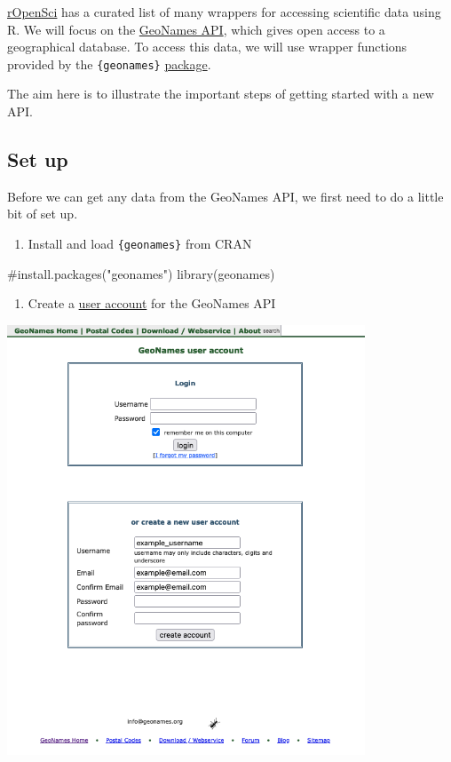\documentclass[
  letterpaper,
  DIV=11,
  numbers=noendperiod]{scrreprt}
\newenvironment{Shaded}{\begin{snugshade}}{\end{snugshade}}
\newcommand{\CommentTok}[1]{\textcolor[rgb]{0.37,0.37,0.37}{#1}}
\newcommand{\FunctionTok}[1]{\textcolor[rgb]{0.28,0.35,0.67}{#1}}
\newcommand{\NormalTok}[1]{\textcolor[rgb]{0.00,0.23,0.31}{#1}}
\providecommand{\tightlist}{%
  \setlength{\itemsep}{0pt}\setlength{\parskip}{0pt}}\usepackage{longtable,booktabs,array}
\begin{document}
\href{https://ropensci.org/}{rOpenSci} has a curated list of many
wrappers for accessing scientific data using R. We will focus on the
\href{https://www.geonames.org/}{GeoNames API}, which gives open access
to a geographical database. To access this data, we will use wrapper
functions provided by the \texttt{\{geonames\}}
\href{https://docs.ropensci.org/geonames/}{package}.

The aim here is to illustrate the important steps of getting started
with a new API.

\subsection{Set up}\label{set-up}

Before we can get any data from the GeoNames API, we first need to do a
little bit of set up.

\begin{enumerate}
\def\labelenumi{\arabic{enumi}.}
\tightlist
\item
  Install and load \texttt{\{geonames\}} from CRAN
\end{enumerate}

\begin{Shaded}
\begin{Highlighting}[]
\CommentTok{\#install.packages("geonames")}
\FunctionTok{library}\NormalTok{(geonames)}
\end{Highlighting}
\end{Shaded}

\begin{enumerate}
\def\labelenumi{\arabic{enumi}.}
\setcounter{enumi}{1}
\tightlist
\item
  Create a \href{https://www.geonames.org/login}{user account} for the
  GeoNames API
\end{enumerate}

\begin{center}
\includegraphics[width=0.8\textwidth,height=\textheight]{images/203-data-apis/sign-up.png}
\end{center}
\end{document}
